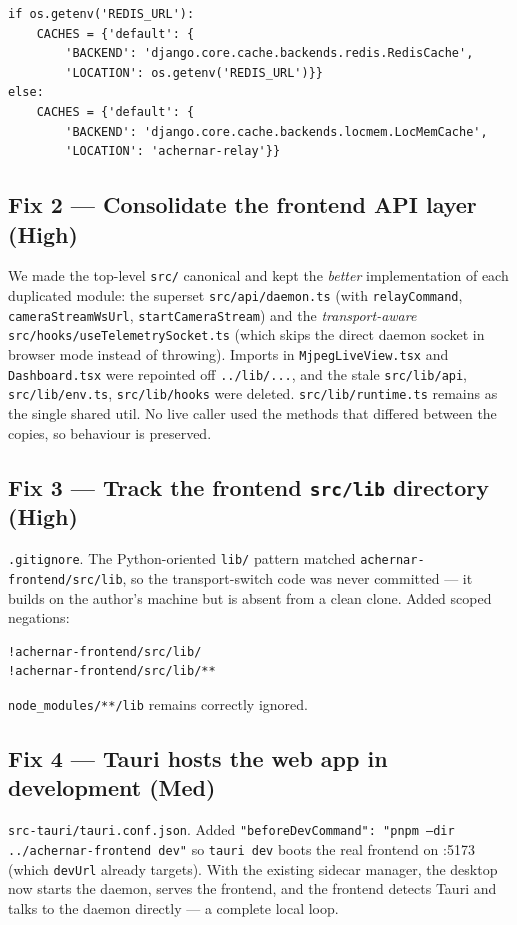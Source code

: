 \documentclass[11pt]{article}
\newcommand{\sev}[1]{\textbf{\textcolor{acred}{#1}}}
\newcommand{\sevm}[1]{\textbf{\textcolor{acamber}{#1}}}
\newcommand{\fn}[1]{\texttt{#1}}
\begin{document}
\begin{lstlisting}
if os.getenv('REDIS_URL'):
    CACHES = {'default': {
        'BACKEND': 'django.core.cache.backends.redis.RedisCache',
        'LOCATION': os.getenv('REDIS_URL')}}
else:
    CACHES = {'default': {
        'BACKEND': 'django.core.cache.backends.locmem.LocMemCache',
        'LOCATION': 'achernar-relay'}}
\end{lstlisting}

\subsection{Fix 2 --- Consolidate the frontend API layer (\sev{High})}
We made the top-level \texttt{src/} canonical and kept the \emph{better} implementation of each duplicated
module: the superset \fn{src/api/daemon.ts} (with \texttt{relayCommand}, \texttt{cameraStreamWsUrl},
\texttt{startCameraStream}) and the \emph{transport-aware} \fn{src/hooks/useTelemetrySocket.ts} (which skips
the direct daemon socket in browser mode instead of throwing). Imports in \fn{MjpegLiveView.tsx} and
\fn{Dashboard.tsx} were repointed off \texttt{../lib/...}, and the stale \fn{src/lib/api},
\fn{src/lib/env.ts}, \fn{src/lib/hooks} were deleted. \fn{src/lib/runtime.ts} remains as the single shared
util. No live caller used the methods that differed between the copies, so behaviour is preserved.

\subsection{Fix 3 --- Track the frontend \texttt{src/lib} directory (\sev{High})}
\fn{.gitignore}. The Python-oriented \texttt{lib/} pattern matched \fn{achernar-frontend/src/lib}, so the
transport-switch code was never committed --- it builds on the author's machine but is absent from a clean
clone. Added scoped negations:
\begin{lstlisting}
!achernar-frontend/src/lib/
!achernar-frontend/src/lib/**
\end{lstlisting}
\texttt{node\_modules/**/lib} remains correctly ignored.

\subsection{Fix 4 --- Tauri hosts the web app in development (\sevm{Med})}
\fn{src-tauri/tauri.conf.json}. Added \texttt{"beforeDevCommand": "pnpm --dir ../achernar-frontend dev"}
so \texttt{tauri dev} boots the real frontend on :5173 (which \texttt{devUrl} already targets). With the
existing sidecar manager, the desktop now starts the daemon, serves the frontend, and the frontend detects
Tauri and talks to the daemon directly --- a complete local loop.
\end{document}
